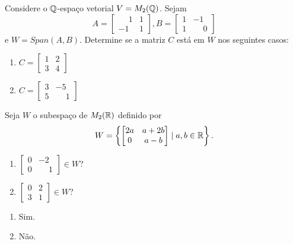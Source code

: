 \documentclass[12pt]{exam}
\begin{document}
\begin{exercicio}
    Considere o $\mathbb{Q}$-espaço vetorial $V = M_2(\mathbb{Q})$. Sejam
    \[
        A = \begin{bmatrix}
            \phantom{-} 1 & 1\\
            -1 & 1
        \end{bmatrix},
        B = \begin{bmatrix}
            1 & -1\\
            1 & \phantom{-} 0
        \end{bmatrix}
    \]
    e $W = Span(A, B)$. Determine se a matriz $C$ está em $W$ nos seguintes casos:
    \begin{enumerate}[label={\alph*})]
        \item $C = \begin{bmatrix}1 & 2\\3 & 4\end{bmatrix}$

        \item $C = \begin{bmatrix}3 & -5\\5 & \phantom{-} 1\end{bmatrix}$
    \end{enumerate}
\end{exercicio}

\begin{exercicio}
	Seja $W$ o subespa\c{c}o de $M_2(\mathbb{R})$ definido por
	\[
	W = \left\{\begin{bmatrix}2a & a + 2b\\0 & a - b\end{bmatrix} \mid a, b \in \mathbb{R}\right\}.
	\]
	\begin{enumerate}[label={\alph*})]
		\item $\begin{bmatrix}0 & -2\\0 & \phantom{-} 1\end{bmatrix} \in W$?
		\item $\begin{bmatrix}0 & 2\\3 & 1\end{bmatrix} \in W$?
	\end{enumerate}
	\begin{solucao}
		\begin{enumerate}[label={\alph*})]
			\item Sim.
			\item N\~ao.
		\end{enumerate}
	\end{solucao}
\end{exercicio}
\end{document}
